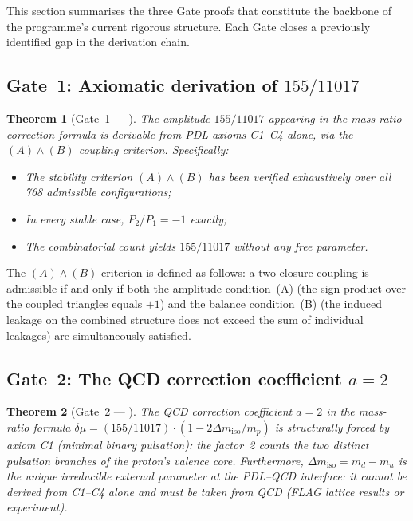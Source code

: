 \documentclass[11pt,a4paper]{article}
\theoremstyle{plain}
\newtheorem{theorem}{Theorem}[section]
\theoremstyle{definition}
\theoremstyle{remark}
\begin{document}
This section summarises the three Gate proofs that constitute the backbone of the programme's current rigorous structure.
Each Gate closes a previously identified gap in the derivation chain.

\subsection{Gate~1: Axiomatic derivation of \texorpdfstring{$155/11017$}{155/11017}}
\label{subsec:gate1}

\begin{theorem}[Gate~1 — \citep{D29}]
\label{thm:Gate1}
The amplitude $155/11017$ appearing in the mass-ratio correction formula is derivable from PDL axioms C1--C4 alone, via the $(A)\wedge(B)$ coupling criterion.
Specifically:
\begin{itemize}
\item The stability criterion $(A)\wedge(B)$ has been verified exhaustively over all 768 admissible configurations;
\item In every stable case, $P_2/P_1 = -1$ exactly;
\item The combinatorial count yields $155/11017$ without any free parameter.
\end{itemize}
\end{theorem}

The $(A)\wedge(B)$ criterion is defined as follows: a two-closure coupling is admissible if and only if both the amplitude condition~(A) (the sign product over the coupled triangles equals $+1$) and the balance condition~(B) (the induced leakage on the combined structure does not exceed the sum of individual leakages) are simultaneously satisfied.

\subsection{Gate~2: The QCD correction coefficient \texorpdfstring{$a=2$}{a=2}}
\label{subsec:gate2}

\begin{theorem}[Gate~2 — \citep{D30}]
\label{thm:Gate2}
The QCD correction coefficient $a=2$ in the mass-ratio formula $\delta\mu = (155/11017)\cdot(1-2\Delta m_{\mathrm{iso}}/m_p)$ is structurally forced by axiom C1 (minimal binary pulsation): the factor~2 counts the two distinct pulsation branches of the proton's valence core.
Furthermore, $\Delta m_{\mathrm{iso}} = m_d - m_u$ is the unique irreducible external parameter at the PDL--QCD interface: it cannot be derived from C1--C4 alone and must be taken from QCD (FLAG lattice results or experiment).
\end{theorem}
\end{document}
